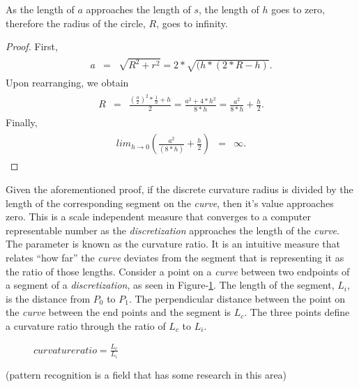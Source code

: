 \begin{theorem}
As the length of $a$ approaches the length of $s$, the length of $h$ goes 
to zero, therefore the radius of the circle, $R$, goes to infinity.  
\end{theorem}

\begin{proof}
First, 
\begin{eqnarray}
\begin{array}{lcl}
a & = & \sqrt{R^2+r^2}=2*\sqrt{(h*(2*R-h)}.
\end{array}
\end{eqnarray}
Upon rearranging, we obtain
\begin{eqnarray}
\begin{array}{lcl}
R & = & \frac{(\frac{a}{2})^2*\frac{1}{h}+h}{2}=
\frac{a^2+4*h^2}{8*h}=\frac{a^2}{8*h}+\frac{h}{2}.
\end{array}
\end{eqnarray}
Finally,
\begin{eqnarray}
\begin{array}{lcl}
lim_{h\to0} (\frac{a^2}{(8*h)}+\frac{h}{2}) & = & \infty.
\end{array}
\end{eqnarray}
\end{proof}

Given the aforementioned proof, if the discrete curvature radius is 
divided by the length of the corresponding segment on the \textit{curve}, 
then it’s value approaches zero. This is a scale independent measure that 
converges to a computer representable number as the 
\textit{discretization} approaches the length of the \textit{curve}. The 
parameter is known as the curvature ratio. It is an intuitive measure that 
relates ``how far'' the \textit{curve} deviates from the segment that is representing it as the ratio of those lengths. Consider a point on a \textit{curve} between two endpoints of a segment of a \textit{discretization}, as seen in Figure-\ref{CurvatureRatio}. The length of the segment, $L_i$, is the distance from $P_0$ to $P_1$. The perpendicular distance between the point on the \textit{curve} between the end points and the segment is $L_c$. The three points define a curvature ratio through the ratio of $L_c$ to $L_i$.

\begin{figure}[h!]
  \caption{\label{CurvatureRatio} $curvature ratio=  \frac{L_c}{L_i}$ 
\cite{mclaurin10}}
\end{figure}

(pattern recognition is a field that has some research in this area)
